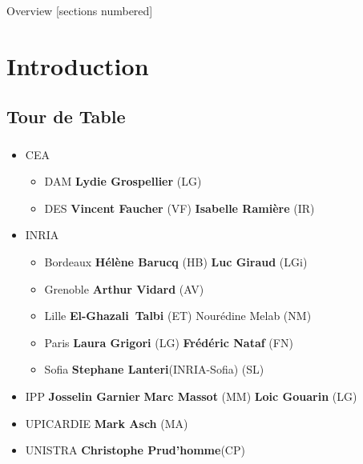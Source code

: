 \titleframe

\begin{frame}{Overview}
  [sections numbered]
  \tableofcontents[hideallsubsections]
\end{frame}


\section{Introduction}
\subsection{Tour de Table}
\begin{frame}
  \frametitle{\insertsectionhead}
  \framesubtitle{\insertsubsectionhead}

  \begin{itemize}
    \item CEA 
    \begin{itemize}
      \item DAM \textbf{Lydie Grospellier} (LG)
      \item DES \textbf{Vincent Faucher} (VF) \textbf{Isabelle Ramière} (IR)  
    \end{itemize}
    \item INRIA 
    \begin{itemize}
      \item Bordeaux \textbf{Hélène Barucq} (HB) \textbf{Luc Giraud} (LGi)
      \item  Grenoble \textbf{Arthur Vidard} (AV)
      \item Lille \textbf{El-Ghazali Talbi} (ET) Nourédine Melab (NM)
      \item Paris \textbf{Laura Grigori} (LG) \textbf{Frédéric Nataf} (FN)
      \item Sofia \textbf{Stephane Lanteri}(INRIA-Sofia) (SL) 
    \end{itemize}
    \item IPP \textbf{Josselin Garnier} \textbf{Marc Massot} (MM) \textbf{Loic Gouarin} (LG)
    \item UPICARDIE \textbf{Mark Asch} (MA)
    \item UNISTRA \textbf{Christophe Prud'homme}(CP) 
  \end{itemize}
\end{frame}
